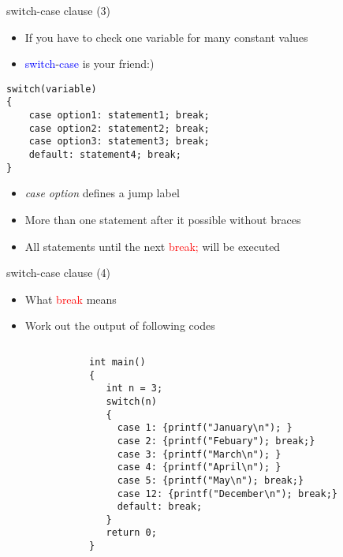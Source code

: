 \begin{frame}[fragile]{switch-case clause (3)}
\begin{itemize}
	\item {If you have to check one variable for many constant values}
	\item {\textcolor{blue}{switch}-\textcolor{blue}{case} is your friend:)}
\end{itemize}
	\begin{lstlisting}[numbers=none, basicstyle=\footnotesize]
switch(variable)
{
    case option1: statement1; break;
    case option2: statement2; break;
    case option3: statement3; break;
    default: statement4; break;
}
\end{lstlisting}
\begin{itemize}
	\item \textit{case option} defines a jump label
	\item More than one statement after it possible without braces
	\item All statements until the next \textcolor{red}{break;} will be executed
\end{itemize}	 
\end{frame}

\begin{frame}[fragile]{switch-case clause (4)}
\begin{itemize}
	\item {What \textcolor{red}{break} means}
	\item {Work out the output of following codes}
\end{itemize}
\vspace{-0.1in}
\begin{columns}
\begin{column}{0.1\linewidth}
\end{column}
\begin{column}{0.8\linewidth}
\begin{lstlisting}[numbers=none, basicstyle=\footnotesize]
int main()
{
   int n = 3;
   switch(n)
   {
     case 1: {printf("January\n"); }
     case 2: {printf("Febuary"); break;}
     case 3: {printf("March\n"); }
     case 4: {printf("April\n"); }
     case 5: {printf("May\n"); break;}
     case 12: {printf("December\n"); break;}
     default: break;
   }
   return 0;
}
\end{lstlisting}
\end{column}
\end{columns} 
\end{frame}



